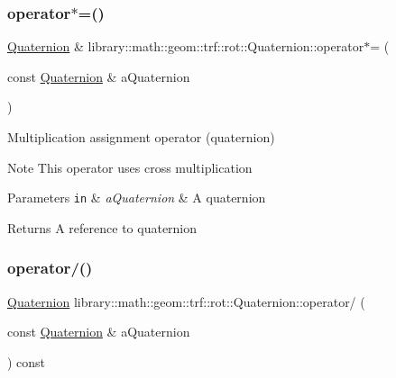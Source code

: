 \subsubsection{\texorpdfstring{operator$\ast$=()}{operator*=()}}
{\footnotesize\ttfamily \hyperlink{classlibrary_1_1math_1_1geom_1_1trf_1_1rot_1_1_quaternion}{Quaternion} \& library\+::math\+::geom\+::trf\+::rot\+::\+Quaternion\+::operator$\ast$= (\begin{DoxyParamCaption}\item[{const \hyperlink{classlibrary_1_1math_1_1geom_1_1trf_1_1rot_1_1_quaternion}{Quaternion} \&}]{a\+Quaternion }\end{DoxyParamCaption})}



Multiplication assignment operator (quaternion) 

\begin{DoxyNote}{Note}
This operator uses cross multiplication
\end{DoxyNote}

\begin{DoxyParams}[1]{Parameters}
\mbox{\tt in}  & {\em a\+Quaternion} & A quaternion \\
\hline
\end{DoxyParams}
\begin{DoxyReturn}{Returns}
A reference to quaternion 
\end{DoxyReturn}
\mbox{\label{classlibrary_1_1math_1_1geom_1_1trf_1_1rot_1_1_quaternion_ac0907a730ef9a96e7c06ce930e86d033}} 
\subsubsection{\texorpdfstring{operator/()}{operator/()}}
{\footnotesize\ttfamily \hyperlink{classlibrary_1_1math_1_1geom_1_1trf_1_1rot_1_1_quaternion}{Quaternion} library\+::math\+::geom\+::trf\+::rot\+::\+Quaternion\+::operator/ (\begin{DoxyParamCaption}\item[{const \hyperlink{classlibrary_1_1math_1_1geom_1_1trf_1_1rot_1_1_quaternion}{Quaternion} \&}]{a\+Quaternion }\end{DoxyParamCaption}) const}



